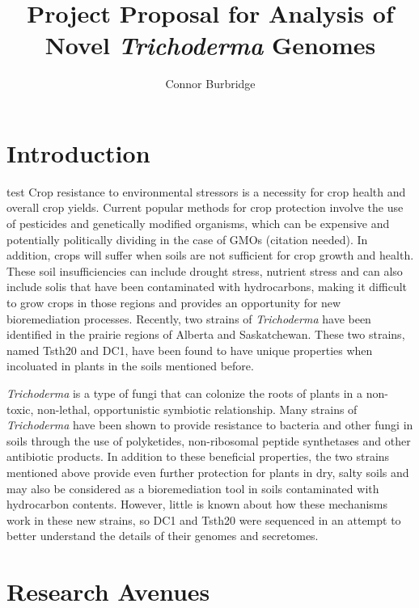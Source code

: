 \documentclass[12pt]{article}
\title{Project Proposal for Analysis of Novel \textit{Trichoderma} Genomes}
\author{Connor Burbridge}
\affil{USask NSID: cbe453 \\
  USask ID no.\ 11162928 \\
  Supervisors: Dave Schneider \& Tony Kusalik\\}
\begin{document}
\parindent=14pt
\maketitle

\clearpage
\tableofcontents
\clearpage

\section{Introduction}

test
Crop resistance to environmental stressors is a necessity for crop
health and overall crop yields. Current popular methods for crop
protection involve the use of pesticides and genetically modified
organisms, which can be expensive and potentially politically dividing
in the case of GMOs (citation needed). In addition, crops will suffer
when soils are not sufficient for crop growth and health. These soil
insufficiencies can include drought stress, nutrient stress and can
also include solis that have been contaminated with hydrocarbons,
making it difficult to grow crops in those regions and provides an
opportunity for new bioremediation processes. Recently, two strains of
\textit{Trichoderma} have been identified in the prairie regions of
Alberta and Saskatchewan. These two strains, named Tsth20 and DC1,
have been found to have unique properties when incoluated in plants in
the soils mentioned before.

\textit{Trichoderma} is a type of fungi that can colonize the roots of
plants in a non-toxic, non-lethal, opportunistic symbiotic
relationship.\cite{Trichoderma} Many strains of \textit{Trichoderma}
have been shown to provide resistance to bacteria and other fungi in
soils through the use of polyketides, non-ribosomal peptide
synthetases and other antibiotic
products\cite{Trichoderma}\cite{Secretome}. In addition to these
beneficial properties, the two strains mentioned above provide even
further protection for plants in dry, salty soils and may also be
considered as a bioremediation tool in soils contaminated with
hydrocarbon contents. However, little is known about how these
mechanisms work in these new strains, so DC1 and Tsth20 were sequenced
in an attempt to better understand the details of their genomes and
secretomes.

\section{Research Avenues}
\end{document}

